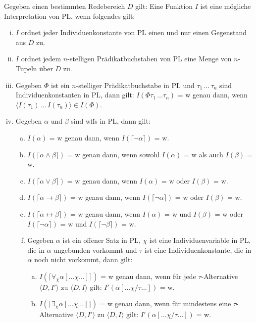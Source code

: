 \documentclass{scrartcl}
\begin{document}
Gegeben einen bestimmten Redebereich $ D $ gilt: Eine Funktion $ I $ ist eine mögliche Interpretation von PL, wenn folgendes gilt:
\begin{enumerate}[(i)]
	\item $ I $ ordnet jeder Individuenkonstante von PL einen und nur einen Gegenstand aus $ D $ zu.
	\item $ I $ ordnet jedem $ n $-stelligen Prädikatbuchstaben von PL eine Menge von $ n $-Tupeln über $ D $ zu.
	\item Gegeben $ \Phi $ ist ein $ n $-stelliger Prädikatbuchstabe in PL und $ \tau_1 \, \ldots \, \tau_n $ sind Individuenkonstanten in PL, dann gilt: $ I(\Phi \tau_1 \, \ldots \tau_n) $ = w genau dann, wenn $ \langle I(\tau_1) \, \ldots \, I(\tau_n) \rangle \in I(\Phi) $.
	\item Gegeben $ \alpha $ und $  \beta $ sind wffs in PL, dann gilt:
	\begin{enumerate}[a)]
		\item $ I(\alpha) $ = w genau dann, wenn $ I(\lceil \neg \alpha \rceil) $ = w.
		\item $ I(\lceil \alpha \wedge \beta \rceil) $ = w genau dann, wenn sowohl $ I(\alpha) $ = w als auch $ I(\beta) $ = w.
		\item $ I(\lceil \alpha \vee \beta \rceil) $ = w genau dann, wenn $ I(\alpha) $ = w oder $ I(\beta) $ = w.
		\item $ I(\lceil \alpha \rightarrow \beta \rceil) $ = w genau dann, wenn $ I(\lceil \neg \alpha \rceil) $ = w oder $ I(\beta) $ = w.
		\item $ I(\lceil \alpha \leftrightarrow \beta \rceil) $ = w genau dann, wenn $ I(\alpha) $ = w und $ I(\beta) $ = w oder $ I(\lceil \neg \alpha \rceil) $ = w und $ I(\lceil \neg \beta \rceil) $ = w.
		\item Gegeben $ \alpha $ ist ein offener Satz in PL, $ \chi $ ist eine Individuenvariable in PL, die in $ \alpha $ ungebunden vorkommt und $ \tau $ ist eine Individuenkonstante, die in $ \alpha $ noch nicht vorkommt, dann gilt:
		\begin{enumerate}[(a)]
			\item $ I(\lceil \forall_\chi \alpha [\ldots \chi \ldots] \rceil) $ = w genau dann, wenn für jede $ \tau $-Alternative $ \langle D,I' \rangle $ zu $ \langle D,I \rangle $ gilt: $ I'(\alpha [\ldots \chi / \tau \ldots]) $ = w.
			\item $ I(\lceil \exists_\chi \alpha [\ldots \chi \ldots] \rceil) $ = w genau dann, wenn für mindestens eine $ \tau $-Alternative $ \langle D,I' \rangle $ zu $ \langle D,I \rangle $ gilt: $ I'(\alpha [\ldots \chi / \tau \ldots]) $ = w.
		\end{enumerate}
	\end{enumerate}
\end{enumerate}
\end{document}
